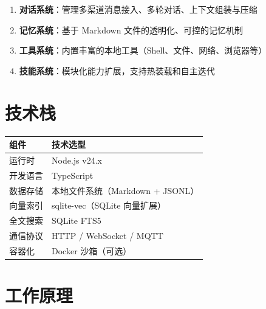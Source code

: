 \begin{enumerate}
  \item \textbf{对话系统}：管理多渠道消息接入、多轮对话、上下文组装与压缩
  \item \textbf{记忆系统}：基于 Markdown 文件的透明化、可控的记忆机制
  \item \textbf{工具系统}：内置丰富的本地工具（Shell、文件、网络、浏览器等）
  \item \textbf{技能系统}：模块化能力扩展，支持热装载和自主迭代
\end{enumerate}

\section{技术栈}

\begin{center}
\begin{tabular}{ll}
\toprule
\textbf{组件} & \textbf{技术选型} \\
\midrule
运行时 & Node.js v24.x \\
开发语言 & TypeScript \\
数据存储 & 本地文件系统（Markdown + JSONL） \\
向量索引 & sqlite-vec（SQLite 向量扩展） \\
全文搜索 & SQLite FTS5 \\
通信协议 & HTTP / WebSocket / MQTT \\
容器化 & Docker 沙箱（可选） \\
\bottomrule
\end{tabular}
\end{center}

\section{工作原理}


